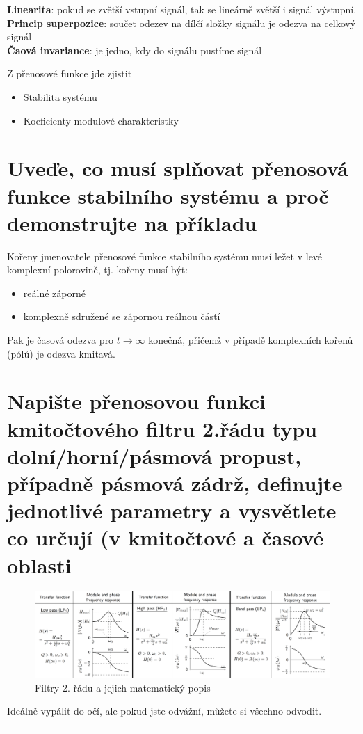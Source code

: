 \documentclass[a4paper,12pt]{article}   %
\begin{document}
\textbf{Linearita}: pokud se zvětší vstupní signál, tak se lineárně zvětší i signál výstupní.\\
\textbf{Princip superpozice}: součet odezev na dílčí složky signálu je odezva na celkový signál\\
\textbf{Čaová invariance}: je jedno, kdy do signálu pustíme signál

Z přenosové funkce jde zjistit
\begin{itemize}
    \item Stabilita systému
    \item Koeficienty modulové charakteristky
\end{itemize}






\section{Uveďe, co musí splňovat přenosová funkce stabilního systému a proč demonstrujte na příkladu}
Kořeny jmenovatele přenosové funkce stabilního systému musí ležet v levé komplexní polorovině, tj. kořeny musí být:
\begin{itemize}
    \item reálné záporné
    \item komplexně sdružené se zápornou reálnou částí
\end{itemize}
Pak je časová odezva pro $t\rightarrow\infty$ konečná, přičemž v případě komplexních kořenů (pólů) je odezva kmitavá.









\section{Napište přenosovou funkci kmitočtového filtru 2.řádu typu dolní/horní/pásmová propust, případně pásmová zádrž, definujte jednotlivé parametry a vysvětlete co určují (v kmitočtové a časové oblasti}
\begin{figure}[h!]
    \centering
    \includegraphics[width=\textwidth]{filtry_2_rad.png}
    \caption{Filtry 2. řádu a jejich matematický popis}
\end{figure}
Ideálně vypálit do očí, ale pokud jste odvážní, můžete si všechno odvodit.
 \\
\hrule%
\end{document}
